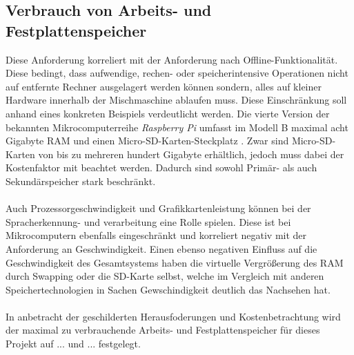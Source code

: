 \subsection{Verbrauch von Arbeits- und Festplattenspeicher}
Diese Anforderung korreliert mit der Anforderung nach Offline-Funktionalität. Diese bedingt, dass aufwendige, rechen- oder speicherintensive Operationen nicht auf entfernte Rechner ausgelagert werden können sondern, alles auf \glqq{}kleiner\grqq{} Hardware innerhalb der Mischmaschine ablaufen muss. Diese Einschränkung soll anhand eines konkreten Beispiels verdeutlicht werden. Die vierte Version der bekannten Mikrocomputerreihe \textit{Raspberry Pi} umfasst im Modell B maximal acht Gigabyte \ac{RAM} und einen Micro-SD-Karten-Steckplatz \cite{ltd_raspberry_nodate}. Zwar sind Micro-SD-Karten von bis zu mehreren hundert Gigabyte erhältlich, jedoch muss dabei der Kostenfaktor mit beachtet werden. Dadurch sind sowohl Primär- als auch Sekundärspeicher stark beschränkt.\\\\
Auch Prozessorgeschwindigkeit und Grafikkartenleistung können bei der Spracherkennung- und verarbeitung eine Rolle spielen. Diese ist bei Mikrocomputern ebenfalls eingeschränkt und korreliert negativ mit der Anforderung an Geschwindigkeit. Einen ebenso negativen Einfluss auf die Geschwindigkeit des Gesamtsystems haben die virtuelle Vergrößerung des \ac{RAM} durch Swapping oder die SD-Karte selbst, welche im Vergleich mit anderen Speichertechnologien in Sachen Gewschindigkeit deutlich das Nachsehen hat.\\\\
In anbetracht der geschilderten Herausfoderungen und Kostenbetrachtung wird der maximal zu verbrauchende Arbeits- und Festplattenspeicher für dieses Projekt auf ... und ... festgelegt.
\endinput